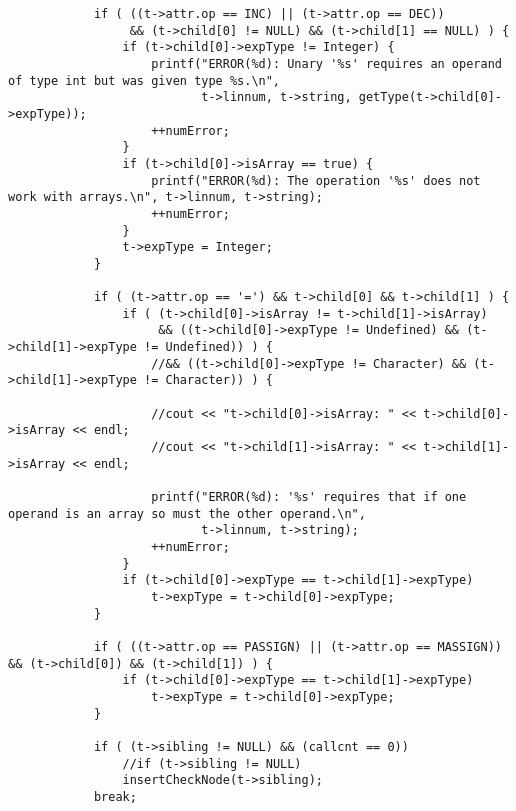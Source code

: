 \documentclass[12pt]{book}
\begin{document}
\begin{lstlisting}
            if ( ((t->attr.op == INC) || (t->attr.op == DEC))
                 && (t->child[0] != NULL) && (t->child[1] == NULL) ) {
                if (t->child[0]->expType != Integer) {
                    printf("ERROR(%d): Unary '%s' requires an operand of type int but was given type %s.\n", 
                           t->linnum, t->string, getType(t->child[0]->expType));
                    ++numError;
                }
                if (t->child[0]->isArray == true) {
                    printf("ERROR(%d): The operation '%s' does not work with arrays.\n", t->linnum, t->string);
                    ++numError;
                }
                t->expType = Integer; 
            }

            if ( (t->attr.op == '=') && t->child[0] && t->child[1] ) {
                if ( (t->child[0]->isArray != t->child[1]->isArray)
                     && ((t->child[0]->expType != Undefined) && (t->child[1]->expType != Undefined)) ) {
                    //&& ((t->child[0]->expType != Character) && (t->child[1]->expType != Character)) ) {

                    //cout << "t->child[0]->isArray: " << t->child[0]->isArray << endl;
                    //cout << "t->child[1]->isArray: " << t->child[1]->isArray << endl;

                    printf("ERROR(%d): '%s' requires that if one operand is an array so must the other operand.\n", 
                           t->linnum, t->string);
                    ++numError;
                }
                if (t->child[0]->expType == t->child[1]->expType)
                    t->expType = t->child[0]->expType;
            }

            if ( ((t->attr.op == PASSIGN) || (t->attr.op == MASSIGN)) && (t->child[0]) && (t->child[1]) ) {
                if (t->child[0]->expType == t->child[1]->expType)
                    t->expType = t->child[0]->expType;
            }

            if ( (t->sibling != NULL) && (callcnt == 0))
                //if (t->sibling != NULL)
                insertCheckNode(t->sibling);
            break;


\end{lstlisting}
\end{document}
